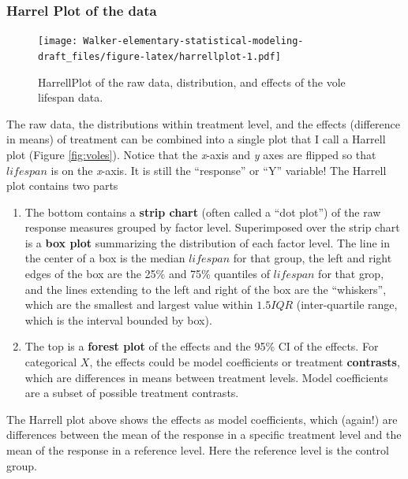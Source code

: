 \documentclass[]{book}
\providecommand{\tightlist}{%
  \setlength{\itemsep}{0pt}\setlength{\parskip}{0pt}}
\theoremstyle{definition}
\theoremstyle{definition}
\theoremstyle{definition}
\theoremstyle{remark}
\begin{document}
\subsubsection{Harrel Plot of the data}\label{harrel-plot-of-the-data}

\begin{figure}
\centering
\texttt{[image: Walker-elementary-statistical-modeling-draft\_files/figure-latex/harrellplot-1.pdf]}
\caption{\label{fig:harrellplot}HarrellPlot of the raw data, distribution,
and effects of the vole lifespan data.}
\end{figure}

The raw data, the distributions within treatment level, and the effects
(difference in means) of treatment can be combined into a single plot
that I call a Harrell plot (Figure \ref{fig:voles}). Notice that the
\emph{x}-axis and \emph{y} axes are flipped so that \(lifespan\) is on
the \emph{x}-axis. It is still the ``response'' or ``Y'' variable! The
Harrell plot contains two parts

\begin{enumerate}
\def\labelenumi{\arabic{enumi}.}
\tightlist
\item
  The bottom contains a \textbf{strip chart} (often called a ``dot
  plot'') of the raw response measures grouped by factor level.
  Superimposed over the strip chart is a \textbf{box plot} summarizing
  the distribution of each factor level. The line in the center of a box
  is the median \(lifespan\) for that group, the left and right edges of
  the box are the 25\% and 75\% quantiles of \(lifespan\) for that grop,
  and the lines extending to the left and right of the box are the
  ``whiskers'', which are the smallest and largest value within
  \(1.5 IQR\) (inter-quartile range, which is the interval bounded by
  box).
\item
  The top is a \textbf{forest plot} of the effects and the 95\% CI of
  the effects. For categorical \(X\), the effects could be model
  coefficients or treatment \textbf{contrasts}, which are differences in
  means between treatment levels. Model coefficients are a subset of
  possible treatment contrasts.
\end{enumerate}

The Harrell plot above shows the effects as model coefficients, which
(again!) are differences between the mean of the response in a specific
treatment level and the mean of the response in a reference level. Here
the reference level is the control group.
\end{document}
